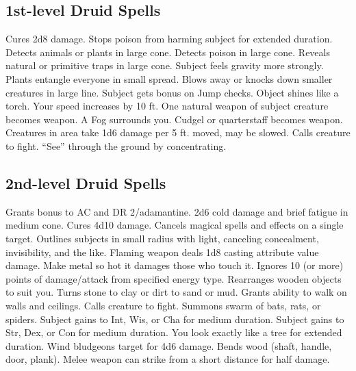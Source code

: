 \subsection{1st-level Druid Spells}
\begin{spelllist}
 Cures 2d8 damage.
 Stops poison from harming subject for extended duration.
 Detects animals or plants in large cone.
 Detects poison in large cone.
 Reveals natural or primitive traps in large cone.
 Subject feels gravity more strongly.
 Plants entangle everyone in small spread.
 Blows away or knocks down smaller creatures in large line.
 Subject gets bonus on Jump checks.
 Object shines like a torch.
 Your speed increases by 10 ft.
 One natural weapon of subject creature becomes  weapon.
 A Fog surrounds you.
 Cudgel or quarterstaff becomes  weapon.
 Creatures in area take 1d6 damage per 5 ft. moved, may be slowed.
 Calls creature to fight.
 ``See'' through the ground by concentrating.
\end{spelllist}

\subsection{2nd-level Druid Spells}
\begin{spelllist}
 Grants  bonus to AC and DR 2/adamantine.
 2d6 cold damage and brief fatigue in medium cone.
 Cures 4d10 damage.
 Cancels magical spells and effects on a single target.
 Outlines subjects in small radius with light, canceling concealment, invisibility, and the like.
 Flaming weapon deals 1d8 \add casting attribute value damage.
 Make metal so hot it damages those who touch it.
 Ignores 10 (or more) points of damage/attack from specified energy type.
 Rearranges wooden objects to suit you.
 Turns stone to clay or dirt to sand or mud.
 Grants ability to walk on walls and ceilings.
 Calls creature to fight.
 Summons swarm of bats, rats, or spiders.
 Subject gains  to Int, Wis, or Cha for medium duration.
 Subject gains  to Str, Dex, or Con for medium duration.
 You look exactly like a tree for extended duration.
 Wind bludgeons target for 4d6 damage.
 Bends wood (shaft, handle, door, plank).
 Melee weapon can strike from a short distance for half damage.
\end{spelllist}

